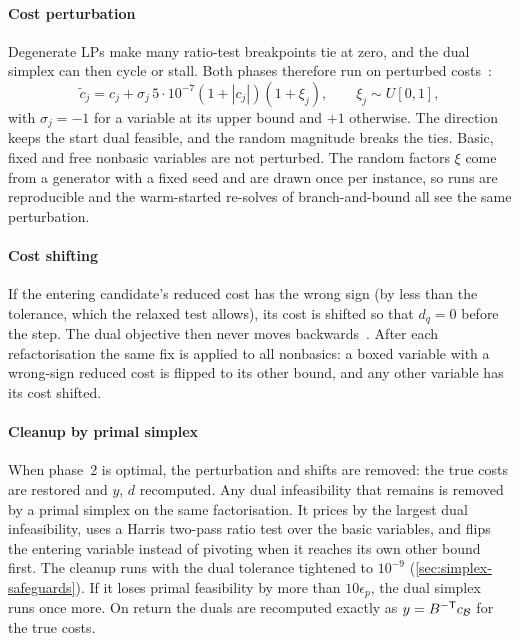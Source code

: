 \paragraph{Cost perturbation}
Degenerate LPs make many ratio-test breakpoints tie at zero, and the dual simplex can then cycle
or stall. Both phases therefore run on perturbed costs~\cite[§6.2.2.3]{koberstein2005}:
\begin{equation}\label{eq:perturb}
  \tilde c_j = c_j + \sigma_j\,5\cdot10^{-7}(1+|c_j|)(1+\xi_j),\qquad \xi_j\sim U[0,1],
\end{equation}
with $\sigma_j=-1$ for a variable at its upper bound and $+1$ otherwise. The direction keeps the
start dual feasible, and the random magnitude breaks the ties. Basic, fixed and free nonbasic
variables are not perturbed. The random factors $\xi$ come from a generator with a fixed seed and are
drawn once per instance, so runs are reproducible and the warm-started re-solves of branch-and-bound
all see the same perturbation.

\paragraph{Cost shifting}
If the entering candidate's reduced cost has the wrong sign (by less than the tolerance, which
the relaxed test allows), its cost is shifted so that $d_q=0$ before the step. The dual objective
then never moves backwards~\cite[§6.2.2.2]{koberstein2005}. After each refactorisation the same fix
is applied to all nonbasics: a boxed variable with a wrong-sign reduced cost is flipped to its other
bound, and any other variable has its cost shifted.

\paragraph{Cleanup by primal simplex}
When phase~2 is optimal, the perturbation and shifts are removed: the true costs are restored and
$y$, $d$ recomputed. Any dual infeasibility that remains is removed by a primal simplex on the same
factorisation. It prices by the largest dual infeasibility, uses a Harris two-pass ratio test over the
basic variables, and flips the entering variable instead of pivoting when it reaches its own
other bound first. The cleanup runs with the dual tolerance tightened to $10^{-9}$
(\cref{sec:simplex-safeguards}). If it loses primal feasibility by more than $10\epsilon_p$, the dual
simplex runs once more. On return the duals are recomputed exactly as $y=B^{-\mathsf{T}} c_{\mathcal B}$ for
the true costs.

